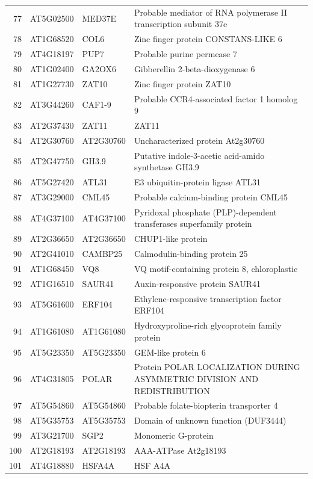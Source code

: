 \documentclass[11pt]{article}
\begin{document}
\begin{center}
\begin{tabular}{rlll}
77 & AT5G02500 & MED37E & Probable mediator of RNA polymerase II transcription subunit 37e\\
78 & AT1G68520 & COL6 & Zinc finger protein CONSTANS-LIKE 6\\
79 & AT4G18197 & PUP7 & Probable purine permease 7\\
80 & AT1G02400 & GA2OX6 & Gibberellin 2-beta-dioxygenase 6\\
81 & AT1G27730 & ZAT10 & Zinc finger protein ZAT10\\
82 & AT3G44260 & CAF1-9 & Probable CCR4-associated factor 1 homolog 9\\
83 & AT2G37430 & ZAT11 & ZAT11\\
84 & AT2G30760 & AT2G30760 & Uncharacterized protein At2g30760\\
85 & AT2G47750 & GH3.9 & Putative indole-3-acetic acid-amido synthetase GH3.9\\
86 & AT5G27420 & ATL31 & E3 ubiquitin-protein ligase ATL31\\
87 & AT3G29000 & CML45 & Probable calcium-binding protein CML45\\
88 & AT4G37100 & AT4G37100 & Pyridoxal phosphate (PLP)-dependent transferases superfamily protein\\
89 & AT2G36650 & AT2G36650 & CHUP1-like protein\\
90 & AT2G41010 & CAMBP25 & Calmodulin-binding protein 25\\
91 & AT1G68450 & VQ8 & VQ motif-containing protein 8, chloroplastic\\
92 & AT1G16510 & SAUR41 & Auxin-responsive protein SAUR41\\
93 & AT5G61600 & ERF104 & Ethylene-responsive transcription factor ERF104\\
94 & AT1G61080 & AT1G61080 & Hydroxyproline-rich glycoprotein family protein\\
95 & AT5G23350 & AT5G23350 & GEM-like protein 6\\
96 & AT4G31805 & POLAR & Protein POLAR LOCALIZATION DURING ASYMMETRIC DIVISION AND REDISTRIBUTION\\
97 & AT5G54860 & AT5G54860 & Probable folate-biopterin transporter 4\\
98 & AT5G35753 & AT5G35753 & Domain of unknown function (DUF3444)\\
99 & AT3G21700 & SGP2 & Monomeric G-protein\\
100 & AT2G18193 & AT2G18193 & AAA-ATPase At2g18193\\
101 & AT4G18880 & HSFA4A & HSF A4A\\

\end{tabular}
\end{center}
\end{document}
